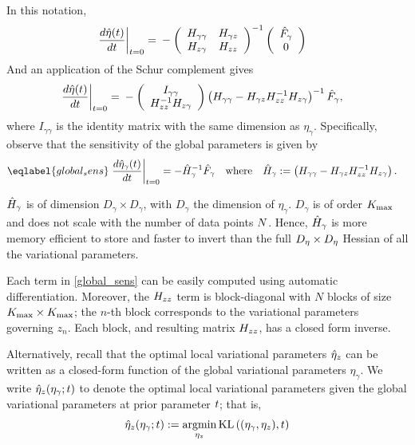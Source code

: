 In this notation,
%
\begin{align*}
%
\fracat{d \etaopt(\t)}{d \t}{t = 0} ={}&
-\left(
\begin{array}{cc}
   \hess{\gamma\gamma} & \hess{\gamma\z} \\
   \hess{\z\gamma}     & \hess{\z\z} \\
\end{array}
\right)^{-1}
\left( \begin{array}{c} \crosshessian_\gamma \\ 0 \end{array}\right)
%
\end{align*}
%
And an application of the Schur complement gives
%
\begin{align*}
%
\fracat{d \etaopt(\t)}{d \t}{t = 0} ={}&
-\left(\begin{array}{c}
I_{\gamma\gamma} \\
\hess{\z\z}^{-1} \hess{\z\gamma}
\end{array}\right)
\left(\hess{\gamma\gamma} -
      \hess{\gamma\z} \hess{\z\z}^{-1} \hess{\z\gamma}\right)^{-1} \crosshessian_\gamma,
%
\end{align*}
where $I_{\gamma\gamma}$ is the identity matrix with
the same dimension as $\eta_\gamma$.
Specifically, observe that the sensitivity of the global parameters
is given by
\begin{align}\eqlabel{global_sens}
  \fracat{d \etaopt_\gamma(\t)}{d \t}{t = 0} &=
  - \hessopt_\gamma^{-1}\crosshessian_\gamma
  \mathwhere
  \hessopt_\gamma := \left(\hess{\gamma\gamma} -
        \hess{\gamma\z} \hess{\z\z}^{-1} \hess{\z\gamma}\right).
\end{align}

$\hat{H}_\gamma$ is of dimension $D_\gamma \times D_\gamma$,
with $D_\gamma$ the dimension of $\eta_\gamma$.
$D_\gamma$ is of order ${K_{\mathrm{max}}}$ and
does not scale with the number of data points $N$.
Hence, $\hat{H}_\gamma$ is more memory efficient to store
and faster to invert
than the full ${D_{\eta}}\times{D_{\eta}}$ Hessian of all the variational parameters.

Each term in \eqref{global_sens} can be easily computed using automatic differentiation.
Moreover, the $H_{zz}$ term is block-diagonal with $N$ blocks of size ${K_{\mathrm{max}}}\times{K_{\mathrm{max}}}$;
the $n$-th block corresponds to the variational parameters governing $z_n$.
Each block, and resulting matrix $H_{zz}$, has a closed form inverse.

Alternatively, recall that the optimal local variational parameters $\hat\eta_{z}$ can be written
as a closed-form function of the global variational parameters $\eta_\gamma$.
We write $\hat\eta_{z}(\eta_\gamma; t)$ to denote the optimal local variational parameters given the
global variational parameters at prior parameter $t$; that is,
\begin{align*}
  \hat\eta_{z}(\eta_\gamma; t) := \operatorname*{\mathrm{argmin}}_{\eta_z} \mathrm{KL}\left((\eta_\gamma, \eta_z), t\right)
\end{align*}


